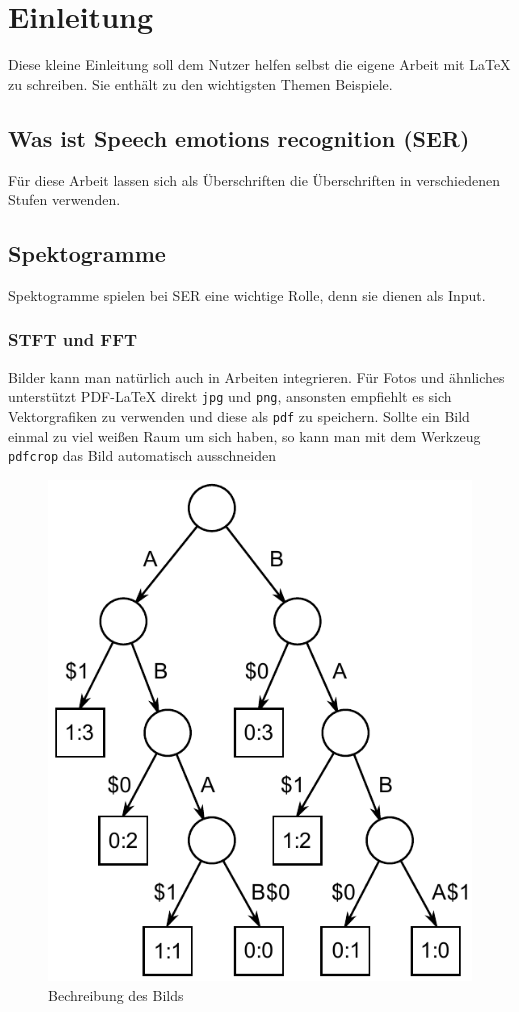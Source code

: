 \chapter{Einleitung}

Diese kleine Einleitung soll dem Nutzer helfen selbst die eigene Arbeit mit \LaTeX{} zu schreiben. Sie enthält zu den wichtigsten Themen Beispiele.


\section{Was ist Speech emotions recognition (SER)}

Für diese Arbeit lassen sich als Überschriften die Überschriften in verschiedenen Stufen verwenden.

\section{Spektogramme}
Spektogramme spielen bei SER eine wichtige Rolle, denn sie dienen als Input. 

\subsection{STFT und FFT}

Bilder kann man natürlich auch in Arbeiten integrieren. Für Fotos und ähnliches unterstützt PDF-\LaTeX{} direkt \verb|jpg| und \verb|png|, ansonsten empfiehlt es sich Vektorgrafiken zu verwenden und diese als \verb|pdf| zu speichern. Sollte ein Bild einmal zu viel weißen Raum um sich haben, so kann man mit dem Werkzeug \verb|pdfcrop| das Bild automatisch ausschneiden

\begin{figure}[ht]
    \centering
    \includegraphics[width=.4\textwidth]{images/Suffix_tree_ABAB_BABA}
    \caption{\label{anker}Bechreibung des Bilds}
\end{figure}

